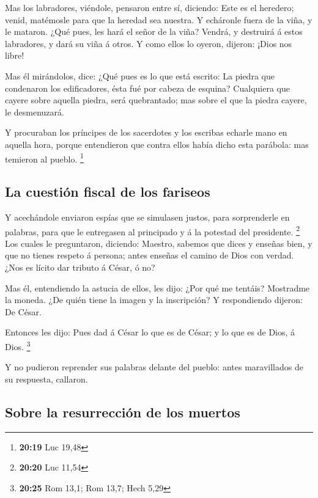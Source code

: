  Mas los labradores, viéndole, pensaron entre sí, diciendo:
Este es el heredero; venid, matémosle para que la heredad sea nuestra.
 Y echáronle fuera de la viña, y le mataron. ¿Qué pues, les
hará el señor de la viña?  Vendrá, y destruirá á estos
labradores, y dará su viña á otros. Y como ellos lo oyeron, dijeron:
¡Dios nos libre!

 Mas él mirándolos, dice: ¿Qué pues es lo que está escrito:
La piedra que condenaron los edificadores, ésta fué por cabeza de
esquina?  Cualquiera que cayere sobre aquella piedra, será
quebrantado; mas sobre el que la piedra cayere, le desmenuzará.

 Y procuraban los príncipes de los sacerdotes y los
escribas echarle mano en aquella hora, porque entendieron que contra
ellos había dicho esta parábola: mas temieron al pueblo. \footnote{\textbf{20:19}
  Luc 19,48}

\hypertarget{la-cuestiuxf3n-fiscal-de-los-fariseos}{%
\subsection{La cuestión fiscal de los
fariseos}\label{la-cuestiuxf3n-fiscal-de-los-fariseos}}

 Y acechándole enviaron espías que se simulasen justos,
para sorprenderle en palabras, para que le entregasen al principado y á
la potestad del presidente. \footnote{\textbf{20:20} Luc 11,54}
 Los cuales le preguntaron, diciendo: Maestro, sabemos que
dices y enseñas bien, y que no tienes respeto á persona; antes enseñas
el camino de Dios con verdad.  ¿Nos es lícito dar tributo á
César, ó no?

 Mas él, entendiendo la astucia de ellos, les dijo: ¿Por
qué me tentáis?  Mostradme la moneda. ¿De quién tiene la
imagen y la inscripción? Y respondiendo dijeron: De César.

 Entonces les dijo: Pues dad á César lo que es de César; y
lo que es de Dios, á Dios. \footnote{\textbf{20:25} Rom 13,1; Rom 13,7;
  Hech 5,29}

 Y no pudieron reprender sus palabras delante del pueblo:
antes maravillados de su respuesta, callaron.

\hypertarget{sobre-la-resurrecciuxf3n-de-los-muertos}{%
\subsection{Sobre la resurrección de los
muertos}\label{sobre-la-resurrecciuxf3n-de-los-muertos}}


